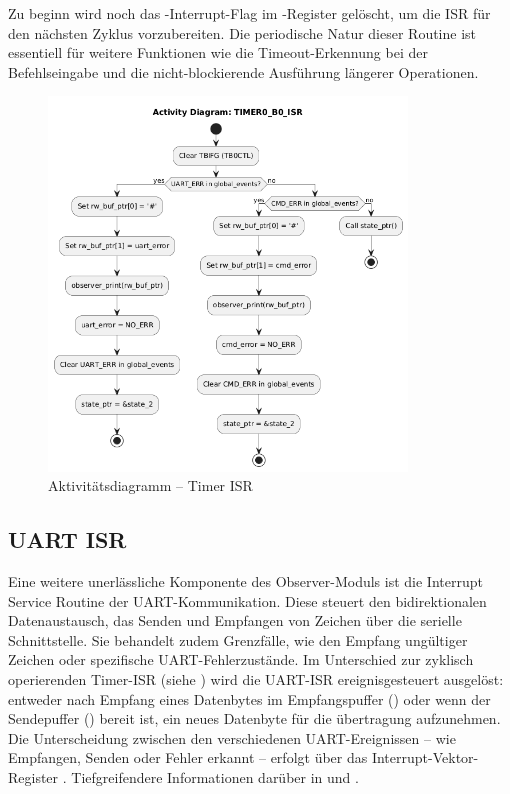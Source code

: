 \newpage
Zu beginn wird noch das -Interrupt-Flag im -Register gel\"oscht, um die ISR f\"ur den n\"achsten Zyklus vorzubereiten. Die periodische Natur dieser Routine ist essentiell f\"ur weitere Funktionen wie die Timeout-Erkennung bei der Befehlseingabe und die nicht-blockierende Ausf\"uhrung l\"angerer Operationen.

\vspace{1cm}
\begin{figure}[h!]
	\centering
	\includegraphics[width=0.85\textwidth]{../Bilder/observer_activity_diagram_timer_b0.png}
	\caption{Aktivit\"atsdiagramm -- Timer ISR}
	\label{fig:activity_diagram_timer_isr}
\end{figure}


\newpage
\subsection{UART ISR}
\label{sec:UART_ISR}

Eine weitere unerl\"assliche Komponente des Observer-Moduls ist die Interrupt Service Routine der UART-Kommunikation. Diese steuert den bidirektionalen Datenaustausch, \dahe das Senden und Empfangen von Zeichen \"uber die serielle Schnittstelle. Sie behandelt zudem Grenzf\"alle, wie den Empfang ung\"ultiger Zeichen oder spezifische UART-Fehlerzust\"ande. Im Unterschied zur zyklisch operierenden Timer-ISR (siehe ) wird die UART-ISR ereignisgesteuert ausgel\"ost: entweder nach Empfang eines Datenbytes im Empfangspuffer () oder wenn der Sendepuffer () bereit ist, ein neues Datenbyte f\"ur die \"ubertragung aufzunehmen. Die Unterscheidung zwischen den verschiedenen UART-Ereignissen -- wie \zB Empfangen, Senden oder Fehler erkannt -- erfolgt \"uber das Interrupt-Vektor-Register . Tiefgreifendere Informationen dar\"uber in  und .

